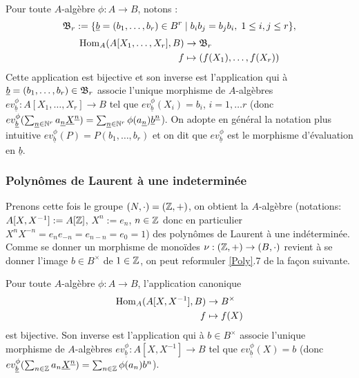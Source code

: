 \begin{definition}
    Pour toute $A$-algèbre $\phi:A\rightarrow B$, notons : $$\frak{B}_r:=
    \lbrace \underline{b}=(b_1,\dots, b_r)\in B^r\;|\; b_ib_j=b_jb_i,\; 1\leq
    i,j\leq r\rbrace,$$
	\begin{align*}
        \operatorname{Hom}_A(A[X_1,\dots,X_r],B) &\to \frak{B}_r \\ f &\mapsto
        (f(X_1),\dots, f(X_r))
    \end{align*}
    Cette application est bijective et son inverse est l'application qui à
    $\underline{b}=(b_1,\dots, b_r)\in \frak{B}_r$ associe l'unique morphisme
    de $A$-algèbres $ev_{\underline{b}}^\phi:A[X_1,\dots, X_r]\rightarrow B$
    tel que $ev_{\underline{b}}^\phi(X_i)=b_i$, $i=1,\dots r$ (donc
    $ev_{\underline{b}}^\phi(\sum_{\underline{n}\in
    \mathbb{N}^r}a_{\underline{n}}\underline{X}^{\underline{n}})=\sum_{\underline{n}\in
    \mathbb{N}^r}\phi(a_{\underline{n}})\underline{b}^{\underline{n}}$). On adopte  en
    général la notation plus intuitive $ev_{\underline{b}}^\phi(P)=P(b_1,\dots,
    b_r)$ et on dit que $ev_{\underline{b}}^\phi$ est le morphisme d'évaluation
    en $\underline{b}$.
\end{definition}

\subsubsection{Polynômes de Laurent à une indeterminée}

Prenons cette fois le groupe $(N,\cdot)=(\mathbb{Z},+)$, on obtient la $A$-algèbre
(notations:  $A[X,X^{-1}]:=A[\mathbb{Z}]$, $X^n:=e_n$, $n\in \mathbb{Z}$ donc en particulier
$X^nX^{-n}=e_ne_{-n}=e_{n-n}=e_0=1$) des polynômes de Laurent à une
indéterminée. Comme se donner    un morphisme de monoïdes
$\nu:(\mathbb{Z},+)\rightarrow (B ,\cdot)$ revient à se donner l'image  $b \in B^\times
$ de $1\in \mathbb{Z}$, on peut reformuler \ref{Poly}.7 de la façon suivante.\\

\begin{definition}
    Pour toute $A$-algèbre $\phi:A\rightarrow B$,  l'application canonique
    \begin{align*}
        \operatorname{Hom}_A(A[X,X^{-1}],B) &\to B^\times \\
        f&\mapsto f(X)
    \end{align*}
    est bijective. Son inverse est l'application qui à $b \in B^\times$ associe
    l'unique morphisme de $A$-algèbres
    $ev_{\underline{b}}^\phi:A[X,X^{-1}]\rightarrow B$ tel que
    $ev_{\underline{b}}^\phi(X)=b$ (donc $ev_{\underline{b}}^\phi(\sum_{n\in
    \mathbb{Z}}a_n\underline{X}^{\underline{n}})=\sum_{n\in \mathbb{Z}}\phi(a_n)b^n$).
\end{definition}

